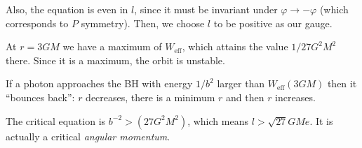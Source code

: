 \documentclass[main.tex]{subfiles}
\begin{document}
Also, the equation is even in \(l\), since it must be invariant under \(\varphi \rightarrow - \varphi \) (which corresponds to \(P\) symmetry).
Then, we choose \(l\) to be positive as our gauge.

At \(r = 3GM\) we have a maximum of \(W _{\text{eff}}\), which attains the value \(1 / 27 G^2M^2\) there.
Since it is a maximum, the orbit is unstable. 

If a photon approaches the BH with energy \(1/ b^2\) larger than \(W _{\text{eff}}(3GM)\) then it ``bounces back'': \(r\) decreases, there is a minimum \(r\) and then \(r\) increases. 

The critical equation is \(b^{-2} > (27 G^2M^2)\), which means \(l > \sqrt{27} GM e\). It is actually a critical \emph{angular momentum}.
\end{document}
